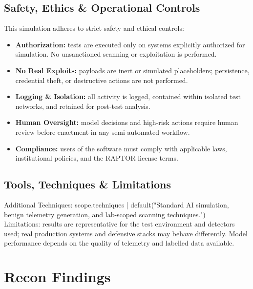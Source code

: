 \documentclass[a4paper,12pt]{article}
\begin{document}
\subsection*{Safety, Ethics \& Operational Controls}
This simulation adheres to strict safety and ethical controls:
\begin{itemize}
    \item \textbf{Authorization:} tests are executed only on systems explicitly authorized for simulation. No unsanctioned scanning or exploitation is performed.
    \item \textbf{No Real Exploits:} payloads are inert or simulated placeholders; persistence, credential theft, or destructive actions are not performed.
    \item \textbf{Logging \& Isolation:} all activity is logged, contained within isolated test networks, and retained for post‑test analysis.
    \item \textbf{Human Oversight:} model decisions and high‑risk actions require human review before enactment in any semi-automated workflow.
    \item \textbf{Compliance:} users of the software must comply with applicable laws, institutional policies, and the RAPTOR license terms.
\end{itemize}

\subsection*{Tools, Techniques \& Limitations}
Additional Techniques: {{ scope.techniques | default("Standard AI simulation, benign telemetry generation, and lab-scoped scanning techniques.") }} \\[0.2cm]
Limitations: results are representative for the test environment and detectors used; real production systems and defensive stacks may behave differently. Model performance depends on the quality of telemetry and labelled data available.

\newpage


\section*{Recon Findings}
\end{document}
